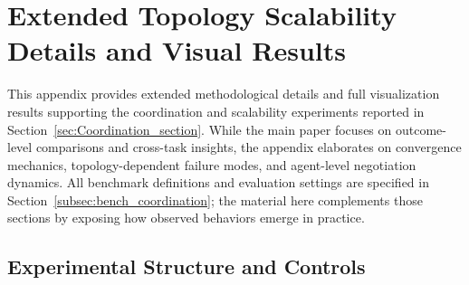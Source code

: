 





% 
% 
% 
% 
% 















\newpage

\section{Extended Topology Scalability Details and Visual Results}
\label{appendix:extended}

This appendix provides extended methodological details and full visualization results supporting the coordination and scalability experiments reported in Section~\ref{sec:Coordination_section}. While the main paper focuses on outcome-level comparisons and cross-task insights, the appendix elaborates on convergence mechanics, topology-dependent failure modes, and agent-level negotiation dynamics. All benchmark definitions and evaluation settings are specified in Section~\ref{subsec:bench_coordination}; the material here complements those sections by exposing how observed behaviors emerge in practice.

\subsection{Experimental Structure and Controls}

